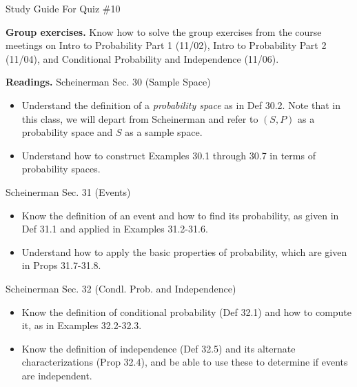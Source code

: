 \documentclass[10pt]{beamer}
\begin{document}
\begin{frame}{Study Guide For Quiz \#10}
\scriptsize 

\colorbox{yellow!20}{\textbf{Group exercises.}} Know how to solve the group exercises from the course meetings on Intro to Probability Part 1 (11/02), Intro to Probability Part 2 (11/04), and Conditional Probability and Independence (11/06). 

\vfill 

\colorbox{red!20}{\textbf{Readings.}}   
Scheinerman Sec. 30 (Sample Space)
\vspace{-.2cm}
\begin{itemize}
\item Understand the definition of a \textit{probability space}  as in Def 30.2. Note that in this class, we will depart from Scheinerman and refer to $(S,P)$ as a \alert{probability space} and $S$ as a \alert{sample space}. 
\item Understand how to construct Examples 30.1 through 30.7 in terms of probability spaces.
\end{itemize}


Scheinerman Sec. 31 (Events)
\vspace{-.2cm}
\begin{itemize}
\item Know the definition of an event and how to find its probability, as given in Def 31.1 and applied in Examples 31.2-31.6. 
\item Understand how to apply the basic properties of probability, which are given in Props 31.7-31.8. 
\end{itemize}

Scheinerman Sec. 32 (Condl. Prob. and Independence)
\vspace{-.2cm}
\begin{itemize}
\item Know the definition of conditional probability (Def 32.1) and how to compute it, as in Examples 32.2-32.3.
\item Know the definition of independence (Def 32.5) and its alternate characterizations (Prop 32.4), and be able to use these to determine if events are independent.
\end{itemize}


\end{frame}
\end{document}
